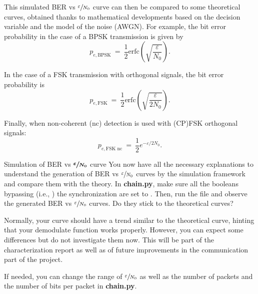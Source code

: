 This simulated BER vs $\sfrac{\varepsilon}{N_0}$ curve can then be compared to some theoretical curves, obtained thanks to mathematical developments based on the decision variable and the model of the noise (AWGN). For example, the bit error probability in the case of a BPSK transmission is given by
\begin{equation*}
    p_{e,\text{BPSK}}\:=\:\frac{1}{2} \text{erfc}\left(\sqrt{\frac{\varepsilon}{N_0}}\right).
\end{equation*}

In the case of a FSK transmission with orthogonal signals, the bit error probability is
\begin{equation*}
    p_{e,\text{FSK}}\:=\:\frac{1}{2} \text{erfc}\left(\sqrt{\frac{\varepsilon}{2N_0}}\right).
\end{equation*}

Finally, when non-coherent (nc) detection is used with (CP)FSK orthogonal signals:
\begin{equation*}
    p_{e,\text{FSK nc}}\:=\:\frac{1}{2}e^{-\varepsilon/2N_0}.
\end{equation*}

\begin{bclogo}[couleur = gray!20, arrondi = 0.2, logo=\bccrayon]{Simulation of BER vs $\boldsymbol{\sfrac{\varepsilon}{N_0}}$ curve}
You now have all the necessary explanations to understand the generation of BER vs $\sfrac{\varepsilon}{N_0}$ curves by the simulation framework and compare them with the theory. In \textbf{chain.py}, make sure all the booleans bypassing (i.e., ) the synchronization are set to . Then, run the file and observe the generated BER vs $\sfrac{\varepsilon}{N_0}$ curves. Do they stick to the theoretical curves?

Normally, your curve should have a trend similar to the theoretical curve, hinting that your demodulate function works properly. However, you can expect some differences but do not investigate them now. This will be part of the characterization report as well as of future improvements in the communication part of the project.

If needed, you can change the range of $\sfrac{\varepsilon}{N_0}$ as well as the number of packets and the number of bits per packet in \textbf{chain.py}.
\end{bclogo}
